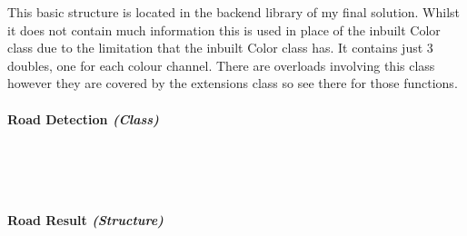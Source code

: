 \begin{FlushLeft}
    This basic structure is located in the backend library of my final solution. Whilst it does not contain much information this is used in place of the inbuilt Color class due to the limitation that the inbuilt Color class has. It contains just 3 doubles, one for each colour channel. There are overloads involving this class however they are covered by the extensions class so see there for those functions.\\
    \bk

    \pagebreak
\paragraph{Road Detection \textit{(Class)}} \mbox{} \\

    \begin{figure}[H]
        \centering
    \end{figure}\\

    \bk

    \pagebreak
\paragraph{Road Result \textit{(Structure)}} \mbox{} \\

    \begin{figure}[H]
        \centering
    \end{figure}\\


\end{FlushLeft}
